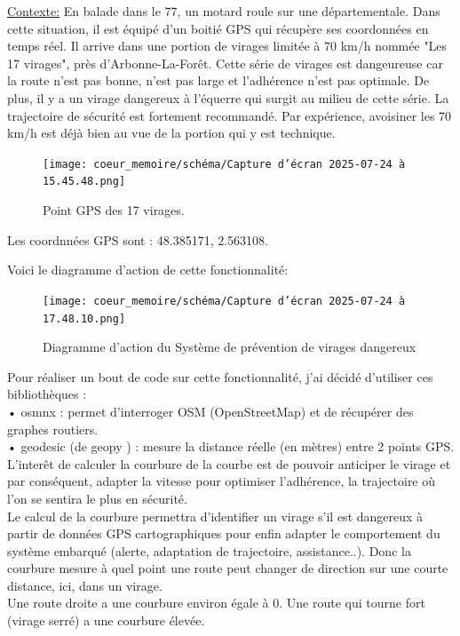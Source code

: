 
\underline{Contexte:} En balade dans le 77, un motard roule sur une départementale. Dans cette situation, il est équipé d'un boitié GPS qui récupère ses coordonnées en temps réel. Il arrive dans une portion de virages limitée à 70 km/h nommée "Les 17 virages", près d'Arbonne-La-Forêt. Cette série de virages est dangeureuse car la route n'est pas bonne, n'est pas large et l'adhérence n'est pas optimale. De plus, il y a un virage dangereux à l'équerre qui surgit au milieu de cette série. La trajectoire de sécurité est fortement recommandé. Par expérience, avoisiner les 70 km/h est déjà bien au vue de la portion qui y est technique.

\begin{figure}[H]
    \centering
    \texttt{[image: coeur\_memoire/schéma/Capture d’écran 2025-07-24 à 15.45.48.png]} 
    \caption{Point GPS des 17 virages.}
\end{figure}




Les coordnnées GPS sont : 48.385171, 2.563108.

Voici le diagramme d'action de cette fonctionnalité:\\

\begin{figure}[H]
    \centering
    \texttt{[image: coeur\_memoire/schéma/Capture d’écran 2025-07-24 à 17.48.10.png]} 
    \caption{Diagramme d'action du Système de prévention de virages dangereux}
\end{figure}

Pour réaliser un bout de code sur cette fonctionnalité, j'ai décidé d'utiliser ces bibliothèques :\\
• osmnx\cite{osm_doc} : permet d’interroger OSM (OpenStreetMap) et de récupérer des graphes routiers.\\
•	geodesic (de geopy \cite{geopy}) : mesure la distance réelle (en mètres) entre 2 points GPS.\\

L'interêt de calculer la courbure de la courbe est de pouvoir anticiper le virage et par conséquent, adapter la vitesse pour optimiser l'adhérence, la trajectoire où l'on se sentira le plus en sécurité. \\
Le calcul de la courbure permettra d'identifier un virage s'il est dangereux à partir de données GPS cartographiques pour enfin adapter le comportement du système embarqué (alerte, adaptation de trajectoire, assistance..).
Donc la courbure mesure à quel point une route peut changer de direction sur une courte distance, ici, dans un virage.\\
Une route droite a une courbure environ égale à 0. Une route qui tourne fort (virage serré) a une courbure élevée.

